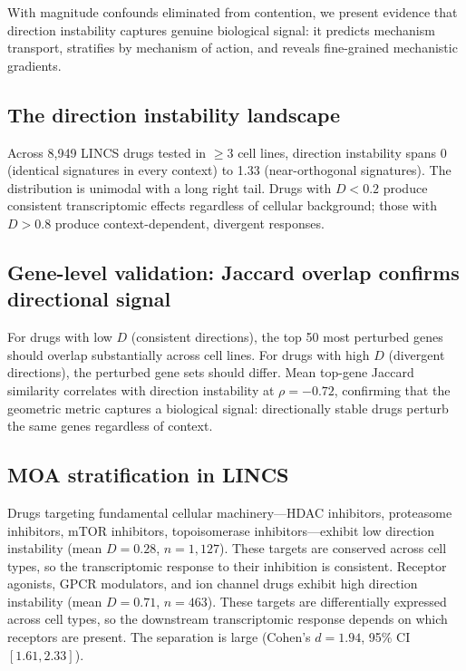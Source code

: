 \documentclass[11pt]{article}
\begin{document}
With magnitude confounds eliminated from contention, we present evidence
that direction instability captures genuine biological signal: it
predicts mechanism transport, stratifies by mechanism of action, and
reveals fine-grained mechanistic gradients.

\subsection{The direction instability landscape}

Across 8{,}949 LINCS drugs tested in $\geq 3$ cell lines, direction
instability spans 0 (identical signatures in every context) to 1.33
(near-orthogonal signatures). The distribution is unimodal with a long
right tail. Drugs with $D < 0.2$ produce consistent transcriptomic
effects regardless of cellular background; those with $D > 0.8$ produce
context-dependent, divergent responses.

\subsection{Gene-level validation: Jaccard overlap confirms directional signal}

For drugs with low $D$ (consistent directions), the top 50 most
perturbed genes should overlap substantially across cell lines. For
drugs with high $D$ (divergent directions), the perturbed gene sets
should differ. Mean top-gene Jaccard similarity correlates with direction
instability at $\rho = -0.72$, confirming that the
geometric metric captures a biological signal: directionally stable drugs
perturb the same genes regardless of context.

\subsection{MOA stratification in LINCS}

Drugs targeting fundamental cellular machinery---HDAC inhibitors,
proteasome inhibitors, mTOR inhibitors, topoisomerase
inhibitors---exhibit low direction instability (mean $D = 0.28$, $n =
1{,}127$). These targets are conserved across cell types, so the
transcriptomic response to their inhibition is consistent. Receptor
agonists, GPCR modulators, and ion channel drugs exhibit high direction
instability (mean $D = 0.71$, $n = 463$). These targets are
differentially expressed across cell types, so the downstream
transcriptomic response depends on which receptors are present.
The separation is large (Cohen's $d = 1.94$, 95\% CI $[1.61, 2.33]$).
\end{document}
